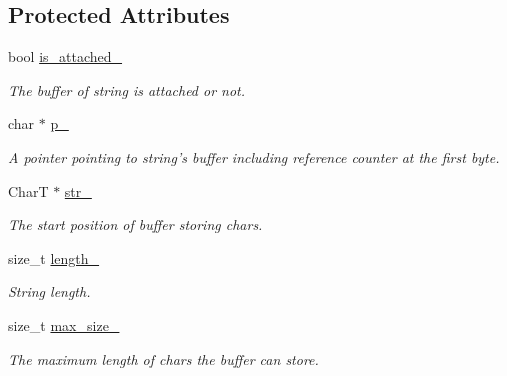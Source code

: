 \subsection*{Protected Attributes}
\begin{CompactItemize}
\item 
\hypertarget{classvector__string_d3c80339c09eb33511812595561fc7d4}{
bool \hyperlink{classvector__string_d3c80339c09eb33511812595561fc7d4}{is\_\-attached\_\-}}
\label{classvector__string_d3c80339c09eb33511812595561fc7d4}

\begin{CompactList}\small\item\em The buffer of string is attached or not. \item\end{CompactList}\item 
\hypertarget{classvector__string_c18abecf6d6a57aee75b0e9e5fd0e4b5}{
char $\ast$ \hyperlink{classvector__string_c18abecf6d6a57aee75b0e9e5fd0e4b5}{p\_\-}}
\label{classvector__string_c18abecf6d6a57aee75b0e9e5fd0e4b5}

\begin{CompactList}\small\item\em A pointer pointing to string's buffer including reference counter at the first byte. \item\end{CompactList}\item 
\hypertarget{classvector__string_e60195f21f225dfc18a9506214052517}{
CharT $\ast$ \hyperlink{classvector__string_e60195f21f225dfc18a9506214052517}{str\_\-}}
\label{classvector__string_e60195f21f225dfc18a9506214052517}

\begin{CompactList}\small\item\em The start position of buffer storing chars. \item\end{CompactList}\item 
\hypertarget{classvector__string_9bb782707a973ad6250e6385c7b6aca1}{
size\_\-t \hyperlink{classvector__string_9bb782707a973ad6250e6385c7b6aca1}{length\_\-}}
\label{classvector__string_9bb782707a973ad6250e6385c7b6aca1}

\begin{CompactList}\small\item\em String length. \item\end{CompactList}\item 
\hypertarget{classvector__string_731edda7e754d371b1efc4e6f68c1c19}{
size\_\-t \hyperlink{classvector__string_731edda7e754d371b1efc4e6f68c1c19}{max\_\-size\_\-}}
\label{classvector__string_731edda7e754d371b1efc4e6f68c1c19}

\begin{CompactList}\small\item\em The maximum length of chars the buffer can store. \item\end{CompactList}\end{CompactItemize}
